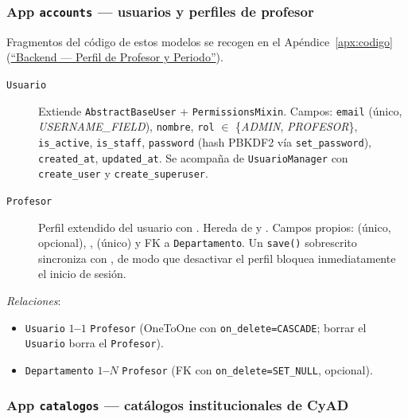 \subsubsection*{App \texttt{accounts} --- usuarios y perfiles de profesor}

Fragmentos del código de estos modelos se recogen en el Apéndice~\ref{apx:codigo} (\hyperref[lst:modelos_perfil_periodo]{``Backend --- Perfil de Profesor y Periodo''}).

\begin{description}
    \item[\texttt{Usuario}] Extiende \texttt{AbstractBaseUser} + \texttt{PermissionsMixin}. Campos: \texttt{email} (único, \emph{USERNAME\_FIELD}), \texttt{nombre}, \texttt{rol} $\in$ \{\emph{ADMIN}, \emph{PROFESOR}\}, \texttt{is\_active}, \texttt{is\_staff}, \texttt{password} (hash PBKDF2 vía \texttt{set\_password}), \texttt{created\_at}, \texttt{updated\_at}. Se acompaña de \texttt{UsuarioManager} con \texttt{create\_user} y \texttt{create\_superuser}.
    \item[\texttt{Profesor}] Perfil extendido del usuario con . Hereda de  y . Campos propios:  (único, opcional), ,  (único) y FK a \texttt{Departamento}. Un \texttt{save()} sobrescrito sincroniza  con , de modo que desactivar el perfil bloquea inmediatamente el inicio de sesión.
\end{description}

\emph{Relaciones}:
\begin{itemize}
    \item \texttt{Usuario} \textbf{$1$--$1$} \texttt{Profesor} (OneToOne con \texttt{on\_delete=CASCADE}; borrar el \texttt{Usuario} borra el \texttt{Profesor}).
    \item \texttt{Departamento} \textbf{$1$--$N$} \texttt{Profesor} (FK con \texttt{on\_delete=SET\_NULL}, opcional).
\end{itemize}

\subsubsection*{App \texttt{catalogos} --- catálogos institucionales de CyAD}

